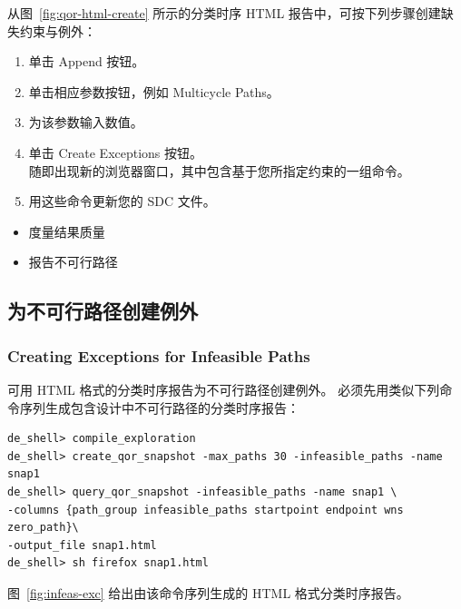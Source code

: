 从图~\ref{fig:qor-html-create} 所示的分类时序 HTML 报告中，可按下列步骤创建缺失约束与例外：
\begin{enumerate}
  \item 单击 Append 按钮。
  \item 单击相应参数按钮，例如 Multicycle Paths。
  \item 为该参数输入数值。
  \item 单击 Create Exceptions 按钮。\\
        随即出现新的浏览器窗口，其中包含基于您所指定约束的一组命令。
  \item 用这些命令更新您的 SDC 文件。
\end{enumerate}

\begin{seeAlsoBox}
\begin{itemize}
  \item 度量结果质量
  \item 报告不可行路径
\end{itemize}
\end{seeAlsoBox}

\subsection{为不可行路径创建例外}
\subsubsection*{Creating Exceptions for Infeasible Paths}

可用 HTML 格式的分类时序报告为不可行路径创建例外。
必须先用类似下列命令序列生成包含设计中不可行路径的分类时序报告：
\begin{lstlisting}
de_shell> compile_exploration
de_shell> create_qor_snapshot -max_paths 30 -infeasible_paths -name snap1
de_shell> query_qor_snapshot -infeasible_paths -name snap1 \
-columns {path_group infeasible_paths startpoint endpoint wns zero_path}\
-output_file snap1.html
de_shell> sh firefox snap1.html
\end{lstlisting}

图~\ref{fig:infeas-exc} 给出由该命令序列生成的 HTML 格式分类时序报告。


